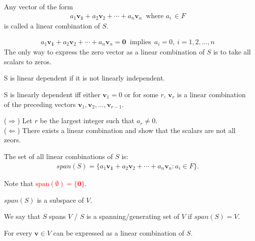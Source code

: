 \documentclass[12pt]{article}
\begin{document}
\begin{definition}
    Any vector of the form
    \begin{align*}
        a_1\mathbf{v_1}+a_2\mathbf{v}_2+\cdots+a_n\mathbf{v}_n\ \text{ where } a_i\, \in F
    \end{align*}
    is called a linear combination of $S$.
\end{definition}

\begin{definition}
    \begin{align*}
        a_1\mathbf{v_1}+a_2\mathbf{v}_2+\cdots+a_n\mathbf{v}_n=\mathbf{0}\ \text{ implies }\, a_i =0 ,\ i=1,2,\ldots,n
    \end{align*}
The only way to express the zero vector as a linear combination of $S$ is to take all scalars to zeros.
\end{definition}

S is linear dependent if it is not linearly independent.

\begin{theorem}
   S is linearly dependent iff either $\mathbf{v}_1=0$ or for some $r$,
   $\mathbf{v}_r$ is a linear combination of the preceding vectors $\mathbf{v}_1,\mathbf{v}_2,\ldots,\mathbf{v}_{r-1}$.
\label{linear-dependent-algorithm}
\end{theorem}



\begin{pfbox}
($\Rightarrow$) Let $r$ be the largest integer such that $a_r\neq 0$.\\
($\Leftarrow$) There exists a linear combination and show that the scalars are not all zeors.
\end{pfbox}


\begin{definition}
    The set of all linear combinations of $S$ is:
    \begin{align*}
        span(S)=\{a_1\mathbf{v_1}+a_2\mathbf{v}_2+\cdots+a_n\mathbf{v}_n:a_i\in F\}.
    \end{align*}
\end{definition}

Note that \textcolor{red}{$\text{span}(\emptyset)=\{\mathbf{0}\}$}.

\begin{theorem}
    $span(S)$ is a subspace of $V$.
\end{theorem}

\begin{definition}
    We say that $S$ spans $V$ / $S$ is a spanning/generating set of $V$
     if $span(S)=V$.
\end{definition}
For every $\mathbf{v} \in V$ can be expressed as a linear combination of $S$.
\end{document}
